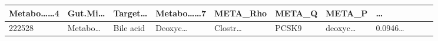 \documentclass[
]{article}
\begin{document}
\begin{longtable}[]{@{}lllllllllll@{}}
\begin{minipage}[b]{0.09\columnwidth}
Metabo\ldots\ldots4\strut
\end{minipage} & \begin{minipage}[b]{0.07\columnwidth}\raggedright
Gut.Mi\ldots{}\strut
\end{minipage} & \begin{minipage}[b]{0.07\columnwidth}\raggedright
Target\ldots{}\strut
\end{minipage} & \begin{minipage}[b]{0.09\columnwidth}\raggedright
Metabo\ldots\ldots7\strut
\end{minipage} & \begin{minipage}[b]{0.07\columnwidth}\raggedright
META\_Rho\strut
\end{minipage} & \begin{minipage}[b]{0.07\columnwidth}\raggedright
META\_Q\strut
\end{minipage} & \begin{minipage}[b]{0.07\columnwidth}\raggedright
META\_P\strut
\end{minipage} & \begin{minipage}[b]{0.03\columnwidth}\raggedright
\ldots{}\strut
\end{minipage}\tabularnewline
\midrule
\endhead
\begin{minipage}[t]{0.05\columnwidth}\raggedright
222528\strut
\end{minipage} & \begin{minipage}[t]{0.07\columnwidth}\raggedright
Metabo\ldots{}\strut
\end{minipage} & \begin{minipage}[t]{0.07\columnwidth}\raggedright
Bile acid\strut
\end{minipage} & \begin{minipage}[t]{0.09\columnwidth}\raggedright
Deoxyc\ldots{}\strut
\end{minipage} & \begin{minipage}[t]{0.07\columnwidth}\raggedright
Clostr\ldots{}\strut
\end{minipage} & \begin{minipage}[t]{0.07\columnwidth}\raggedright
PCSK9\strut
\end{minipage} & \begin{minipage}[t]{0.09\columnwidth}\raggedright
deoxyc\ldots{}\strut
\end{minipage} & \begin{minipage}[t]{0.07\columnwidth}\raggedright
0.0946\ldots{}\strut
\end{minipage} & \begin{minipage}[t]{0.07\columnwidth}\raggedright

\end{minipage}
\end{longtable}
\end{document}
